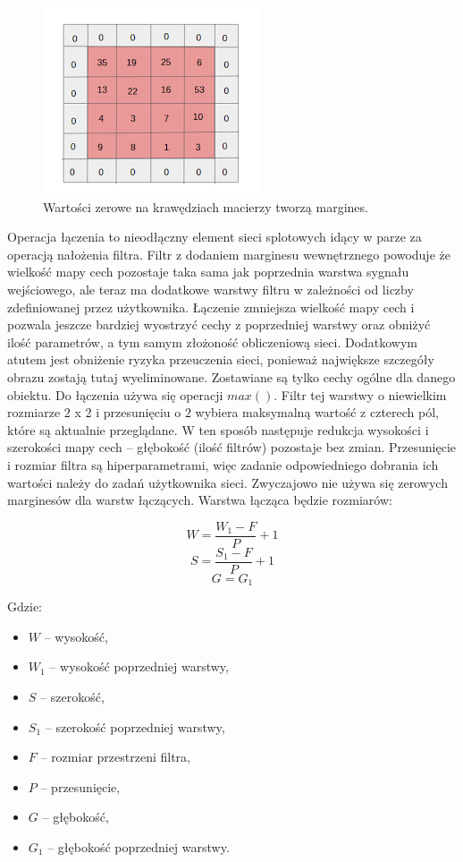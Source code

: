\documentclass[12pt,a4paper,twoside,titlepage,openright]{book}
\begin{document}
\begin{itemize}
\begin{itemize}
\begin{figure}[ht]
	\centering
			\includegraphics[resolution=100]{Padding.png}
		\caption{Wartości zerowe na krawędziach macierzy tworzą margines.}
\end{figure}

Operacja łączenia to nieodłączny element sieci splotowych idący w parze za operacją nałożenia filtra. Filtr z dodaniem marginesu wewnętrznego  powoduje że wielkość mapy cech pozostaje taka sama jak poprzednia warstwa sygnału wejściowego, ale teraz ma dodatkowe warstwy filtru w zależności od liczby zdefiniowanej przez użytkownika. Łączenie zmniejsza wielkość mapy cech i pozwala jeszcze bardziej wyostrzyć cechy z poprzedniej warstwy oraz obniżyć ilość parametrów, a tym samym złożoność obliczeniową sieci. Dodatkowym atutem jest obniżenie ryzyka przeuczenia sieci, ponieważ największe szczegóły obrazu zostają tutaj wyeliminowane. Zostawiane są tylko cechy ogólne dla danego obiektu. Do łączenia używa się operacji $max()$. Filtr tej warstwy o niewielkim rozmiarze 2 x 2 i przesunięciu o \(2\) wybiera maksymalną wartość z czterech pól, które są aktualnie przeglądane. W ten sposób następuje redukcja wysokości i szerokości mapy cech -- głębokość (ilość filtrów) pozostaje  bez zmian. Przesunięcie i rozmiar filtra są hiperparametrami, więc zadanie odpowiedniego dobrania ich wartości należy do zadań użytkownika sieci. Zwyczajowo nie używa się zerowych marginesów dla warstw łączących. Warstwa łącząca będzie rozmiarów:

$$ W = \frac{W_1 - F}{P} + 1 $$
$$ S = \frac{S_1 - F}{P} + 1 $$
$$ G = G_1 $$

Gdzie:
\begin{itemize}
\item $W$ -- wysokość,
\item $W_1$ -- wysokość poprzedniej warstwy,
\item $S$ -- szerokość,
\item $S_1$ -- szerokość poprzedniej warstwy,
\item $F$ -- rozmiar przestrzeni filtra,
\item $P$ -- przesunięcie,
\item $G$ -- głębokość,
\item $G_1$ -- głębokość poprzedniej warstwy.
\end{itemize}


\end{itemize}
\end{itemize}
\end{document}
